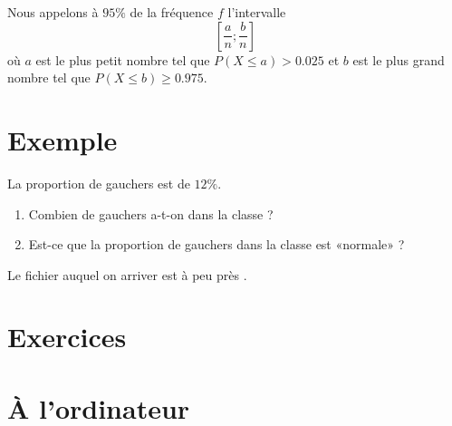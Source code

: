 Nous appelons  à \( 95\%\) de la fréquence \( f\) l'intervalle 
\begin{equation}
    \left[ \frac{ a }{ n };\frac{ b }{ n } \right]
\end{equation}
où \(  a\) est le plus petit nombre tel que \( P(X\leq a)>0.025\) et \( b\) est le plus grand nombre tel que \( P(X\leq b)\geq 0.975\).

\section{Exemple}

La proportion de gauchers est de \( 12\%\).
\begin{enumerate}
    \item
        Combien de gauchers a-t-on dans la classe ?
    \item
        Est-ce que la proportion de gauchers dans la classe est «normale» ?
\end{enumerate}
Le fichier auquel on arriver est à peu près .

\section{Exercices}


\section{À l'ordinateur}


